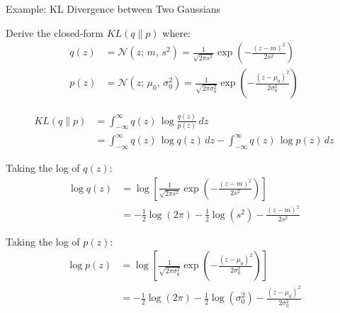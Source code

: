 \documentclass[aspectratio=169,xcolor=dvipsnames,svgnames,x11names,fleqn]{beamer}
\begin{document}
\begin{frame}[allowframebreaks]{Example: KL Divergence between Two Gaussians}


\footnotesize

\begin{tcolorbox}[colframe=uiRose, title=~~]

Derive the closed-form $KL(q \| p)$ where:
\begin{align*}
    q(z) &= \mathcal{N}(z;\, m,\, s^2)
           = \frac{1}{\sqrt{2\pi s^2}} \exp\!\left(-\frac{(z-m)^2}{2s^2}\right) \\[6pt]
    p(z) &= \mathcal{N}(z;\, \mu_0,\, \sigma_0^2)
           = \frac{1}{\sqrt{2\pi\sigma_0^2}} \exp\!\left(-\frac{(z-\mu_0)^2}{2\sigma_0^2}\right)
\end{align*}
\end{tcolorbox}




\begin{tcolorbox}[title=Solution, colframe=theoryBlue, breakable]

\begin{align*}
    KL(q \| p)
    &= \int_{-\infty}^{\infty} q(z)\, \log \frac{q(z)}{p(z)}\, dz \\
    &= \int_{-\infty}^{\infty} q(z)\, \log q(z)\, dz
       - \int_{-\infty}^{\infty} q(z)\, \log p(z)\, dz
\end{align*}

 \end{tcolorbox}

\pause


\begin{tcolorbox}[colframe=theoryBlue, breakable]

 
Taking the log of $q(z)$:
\begin{align*}
    \log q(z)
    &= \log \left[ \frac{1}{\sqrt{2\pi s^2}}
       \exp\!\left(-\frac{(z-m)^2}{2s^2}\right) \right] \\
    &= -\frac{1}{2}\log(2\pi) - \frac{1}{2}\log(s^2) - \frac{(z-m)^2}{2s^2}
\end{align*}
 
 
 Taking the log of $p(z)$:
\begin{align*}
    \log p(z)
    &= \log \left[ \frac{1}{\sqrt{2\pi\sigma_0^2}}
       \exp\!\left(-\frac{(z-\mu_0)^2}{2\sigma_0^2}\right) \right] \\
    &= -\frac{1}{2}\log(2\pi) - \frac{1}{2}\log(\sigma_0^2) - \frac{(z-\mu_0)^2}{2\sigma_0^2}
\end{align*}


\end{tcolorbox}
\end{frame}
\end{document}
